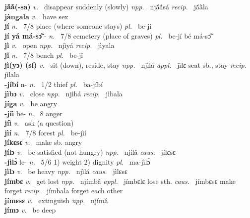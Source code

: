 \noindent
{\bfseries jã́ã̀(-sa)}  {\itshape v.~} disappear suddenly (slowly)   {\itshape npp.~} njã́ã́sá {\itshape recip.~} jã́ã̀la  \\ 
{\bfseries jàngala}  {\itshape v.~} have sex    \\ 
{\bfseries jí}  {\itshape n.~} 7/8 place (where someone stays) {\itshape pl.~} be-jí    \\ 
{\bfseries jí yá má-sɔ̃̂} - {\itshape n.~} 7/8 cemetery (place of graves) {\itshape pl.~} be-jí bé má-sɔ̃̂    \\ 
{\bfseries jì}  {\itshape v.~} open   {\itshape npp.~} njìyá {\itshape recip.~} jìyala  \\ 
{\bfseries  jǐ}  {\itshape n.~} 7/8 bench {\itshape pl.~} be-jǐ    \\ 
{\bfseries jì(yɔ) (sí)}  {\itshape v.~} sit (down), reside, stay   {\itshape npp.~} njìlá {\itshape appl.~} jìlɛ seat sb., stay {\itshape recip.~} jìlala  \\ 
{\bfseries -jíbí} n- {\itshape n.~} 1/2 thief {\itshape pl.~} ba-jíbí    \\ 
{\bfseries jìbɔ}  {\itshape v.~} close {\itshape npp.~} njìbá {\itshape recip.~} jìbala  \\ 
{\bfseries jíga}  {\itshape v.~} be angry    \\ 
{\bfseries -jíì} be- {\itshape n.~} 8 anger    \\ 
{\bfseries jíì}  {\itshape v.~} ask (a question)    \\ 
{\bfseries jìí}  {\itshape n.~} 7/8 forest {\itshape pl.~} be-jìí    \\ 
{\bfseries jíkɛsɛ}  {\itshape v.~} make sb. angry    \\ 
{\bfseries jílɔ}  {\itshape v.~} be satisfied (not hungry)   {\itshape npp.~} njílâ {\itshape caus.~} jílɛsɛ  \\ 
{\bfseries -jìlɔ̀} le- {\itshape n.~} 5/6 1) weight 2) dignity {\itshape pl.~} ma-jìlɔ̀    \\ 
{\bfseries jìlɔ}  {\itshape v.~} be heavy   {\itshape npp.~} njìlá {\itshape caus.~} jìlɛsɛ  \\ 
{\bfseries jímbɛ}  {\itshape v.~} get lost   {\itshape npp.~} njímbâ {\itshape appl.~} jímbɛlɛ lose sth. {\itshape caus.~} jímbɛsɛ make forget {\itshape recip.~} jímbala forget each other  \\ 
{\bfseries jímɛsɛ}  {\itshape v.~} extinguish   {\itshape npp.~} njímâ  \\ 
{\bfseries jímɔ}  {\itshape v.~} be deep    \\ 

